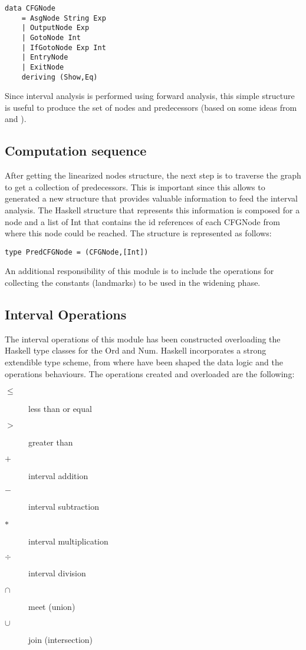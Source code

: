 \documentclass{article}
\begin{document}
\begin{verbatim}
data CFGNode
    = AsgNode String Exp 
    | OutputNode Exp
    | GotoNode Int
    | IfGotoNode Exp Int 
    | EntryNode
    | ExitNode
    deriving (Show,Eq)

\end{verbatim}

Since interval analysis is performed using forward analysis, this simple structure is useful to produce the set of nodes and predecessors (based on some ideas from \cite{Cousot} and \cite{Bourdoncle}). %


\subsection{Computation sequence} 

After getting the linearized nodes structure, the next step is to traverse the graph to get a collection of predecessors. This is important since this allows to generated a new structure that provides valuable information to  feed the interval analysis.  The Haskell structure that represents this information is composed for a node and a list of Int that contains the id references of each CFGNode from where this node could be reached. The  structure is represented as follows:

\begin{verbatim}
type PredCFGNode = (CFGNode,[Int])
\end{verbatim}

An additional responsibility of this module is to include the operations for collecting the constants (landmarks) to be used in the widening phase.

\subsection{Interval Operations}
The interval operations of this module has been constructed overloading the Haskell type classes for the Ord and Num. Haskell incorporates a strong extendible type scheme, from where have been shaped the data logic and the operations behaviours. The operations created and overloaded are the following:

\begin{description}
  \item[$ \le $] less than or equal
  \item[$ > $] greater than 
  \item[$ + $] interval addition 
  \item[$ - $] interval subtraction
  \item[$ * $] interval multiplication 
  \item[$ \div $] interval division
  \item[$ \cap $] meet (union)
  \item[$ \cup $] join (intersection) 
\end{description}
\end{document}
